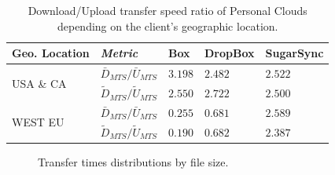 \begin{table}[h]
\begin{center}
\begin{tabular}{|l|l|l|l|l|}
\hline
 Geo. Location& \textit{Metric} & Box & DropBox & SugarSync \\ \hline
\multirow{2}{*}{USA \& CA}
 & $\bar{D}_{MTS}/\bar{U}_{MTS}$ & $3.198$ & $2.482$ & $2.522$ \\
 & $\tilde{D}_{MTS}/\tilde{U}_{MTS}$ & $2.550$ & $2.722$ & $2.500$ \\ \hline
\multirow{2}{*}{WEST EU}
 & $\bar{D}_{MTS}/\bar{U}_{MTS}$ & $0.255$ & $0.681$ & $2.589$ \\
 & $\tilde{D}_{MTS}/\tilde{U}_{MTS}$ & $0.190$ & $0.682$ & $2.387$ \\ \hline
\end{tabular}
\caption{Download/Upload transfer speed ratio of Personal Clouds depending on the client's geographic location.}
\vspace{-5mm}
\label{tab:down_up_ratio_location}
\end{center}
\end{table}

\begin{figure}
\centering	
	\caption{Transfer times distributions by file size.}
	\label{fig:transfer_times_and_speed_by_size}
\end{figure}


